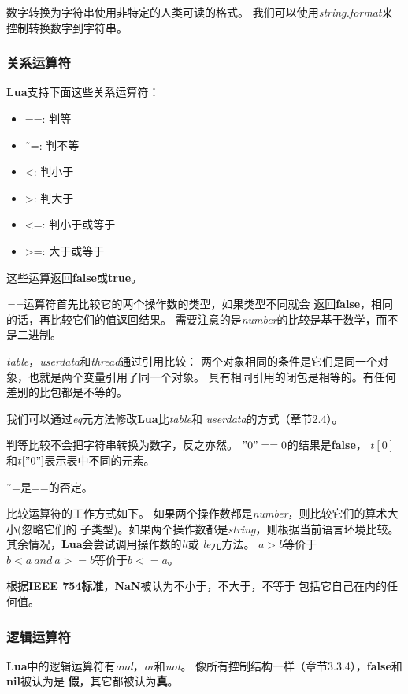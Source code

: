 \documentclass{ctexart}
\begin{document}
数字转换为字符串使用非特定的人类可读的格式。
我们可以使用\emph{string.format}来控制转换数字到字符串。

\subsubsection{关系运算符}

\textbf{Lua}支持下面这些关系运算符：

\begin{itemize}
\item ==: 判等
\item \~\ =: 判不等
\item <: 判小于
\item >: 判大于
\item <=: 判小于或等于
\item >=: 大于或等于
\end{itemize}

这些运算返回\textbf{false}或\textbf{true}。

\emph{==}运算符首先比较它的两个操作数的类型，如果类型不同就会
返回\textbf{false}，相同的话，再比较它们的值返回结果。
需要注意的是\emph{number}的比较是基于数学，而不是二进制。

\emph{table}，\emph{userdata}和\emph{thread}通过引用比较：
两个对象相同的条件是它们是同一个对象，也就是两个变量引用了同一个对象。
具有相同引用的闭包是相等的。有任何差别的比包都是不等的。

我们可以通过\emph{eq}元方法修改\textbf{Lua}比\emph{table}和
\emph{userdata}的方式（章节2.4）。

判等比较不会把字符串转换为数字，反之亦然。
$"0"==0$的结果是\textbf{false}，
$t[0]$和$t["0"]$表示表中不同的元素。

\~\ =是==的否定。

比较运算符的工作方式如下。
如果两个操作数都是\emph{number}，则比较它们的算术大小(忽略它们的
子类型)。如果两个操作数都是\emph{string}，则根据当前语言环境比较。
其余情况，\textbf{Lua}会尝试调用操作数的\emph{lt}或
\emph{le}元方法。
$a>b$等价于$b<a\ and\ a>=b$等价于$b<=a$。

根据\textbf{IEEE 754标准}，\textbf{NaN}被认为不小于，不大于，不等于
包括它自己在内的任何值。

\subsubsection{逻辑运算符}

\textbf{Lua}中的逻辑运算符有\emph{and}，\emph{or}和\emph{not}。
像所有控制结构一样（章节3.3.4），\textbf{false}和\textbf{nil}被认为是
\textbf{假}，其它都被认为\textbf{真}。
\end{document}
